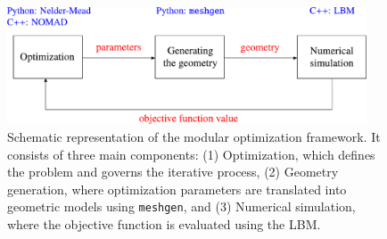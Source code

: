 \begin{figure}[H]
	\vspace{5mm}
	\centering
	\includegraphics[width=0.95\textwidth]{figures/framework-en.pdf}
	\vspace{5mm}
	\caption{Schematic representation of the modular optimization framework. It consists of three main components: (1) Optimization, which defines the problem and governs the iterative process, (2) Geometry generation, where optimization parameters are translated into geometric models using \texttt{meshgen}, and (3) Numerical simulation, where the objective function is evaluated using the LBM.}
	\label{fig:framework}
	
\end{figure}